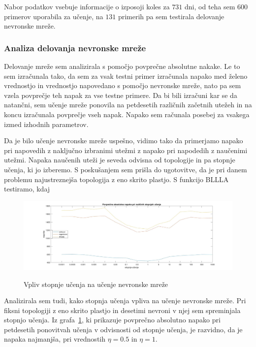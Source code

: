 \documentclass[mat1]{fmfdelo}
\begin{document}
Nabor podatkov vsebuje informacije o izposoji koles za $731$ dni, od teha sem $600$ primerov uporabila za učenje, na $131$ primerih pa sem testirala delovanje nevronske mreže.
%
\subsubsection{Analiza delovanja nevronske mreže}
Delovanje mreže sem analizirala s pomočjo povprečne absolutne nakake. Le to sem izračunala tako, da sem za vsak testni primer izračunala napako med želeno vrednostjo in vrednostjo napovedano s pomočjo nevronske mreže, nato pa sem vzela povprečje teh napak za vse testne primere. Da bi bili izračuni kar se da natančni, sem učenje mreže ponovila na petdesetih različnih začetnih utežeh in na koncu izračunala povprečje vseh napak. Napako sem računala posebej za vsakega izmed izhodnih parametrov.

Da je bilo učenje nevronske mreže uspešno, vidimo tako da primerjamo napako pri napovedih z naključno izbranimi utežmi z napako pri napodedih z naučenimi utežmi. Napaka naučenih uteži je seveda odvisna od topologije in pa stopnje učenja, ki jo izberemo. S poskušanjem sem prišla do ugotovitve, da je pri danem problemu najustreznejša topologija z eno skrito plastjo.
S funkcijo BLLLA testiramo, kdaj 

\begin{figure}[!ht]
	\centering
	\includegraphics[width=1\textwidth]{rate.jpg}
	\label{fig:rate}
	\caption{Vpliv stopnje učenja na učenje nevronske mreže}
\end{figure}
Analizirala sem tudi, kako stopnja učenja vpliva na učenje nevronske mreže. Pri fiksni topologiji z eno skrito plastjo in desetimi nevroni v njej sem spreminjala stopnjo učenja. Iz grafa~\ref{fig:rate}, ki prikazuje povprečno absolutno napako pri petdesetih ponovitvah učenja v odvisnosti od stopnje učenja, je razvidno, da je napaka najmanjša, pri vrednostih $\eta = 0.5$ in $\eta = 1$.
\end{document}
